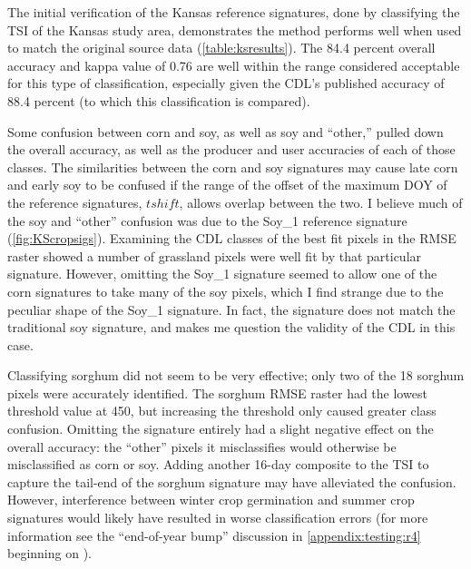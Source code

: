 The initial verification of the Kansas reference signatures, done by classifying the TSI of the Kansas study area, demonstrates the method performs well when used to match the original source data (\autoref{table:ksresults}). The 84.4 percent overall accuracy and kappa value of 0.76 are well within the range considered acceptable for this type of classification, especially given the CDL's published accuracy of 88.4 percent (to which this classification is compared).

Some confusion between corn and soy, as well as soy and ``other,'' pulled down the overall accuracy, as well as the producer and user accuracies of each of those classes. The similarities between the corn and soy signatures may cause late corn and early soy to be confused if the range of the offset of the maximum DOY of the reference signatures, $tshift$, allows overlap between the two. I believe much of the soy and ``other'' confusion was due to the Soy\_1 reference signature (\autoref{fig:KScropsigs}). Examining the CDL classes of the best fit pixels in the RMSE raster showed a number of grassland pixels were well fit by that particular signature. However, omitting the Soy\_1 signature seemed to allow one of the corn signatures to take many of the soy pixels, which I find strange due to the peculiar shape of the Soy\_1 signature. In fact, the signature does not match the traditional soy signature, and makes me question the validity of the CDL in this case.

Classifying sorghum did not seem to be very effective; only two of the 18 sorghum pixels were accurately identified. The sorghum RMSE raster had the lowest threshold value at 450, but increasing the threshold only caused greater class confusion. Omitting the signature entirely had a slight negative effect on the overall accuracy: the ``other'' pixels it misclassifies would otherwise be misclassified as corn or soy. Adding another 16-day composite to the TSI to capture the tail-end of the sorghum signature may have alleviated the confusion. However, interference between winter crop germination and summer crop signatures would likely have resulted in worse classification errors (for more information see the ``end-of-year bump'' discussion in \autoref{appendix:testing:r4} beginning on ).

